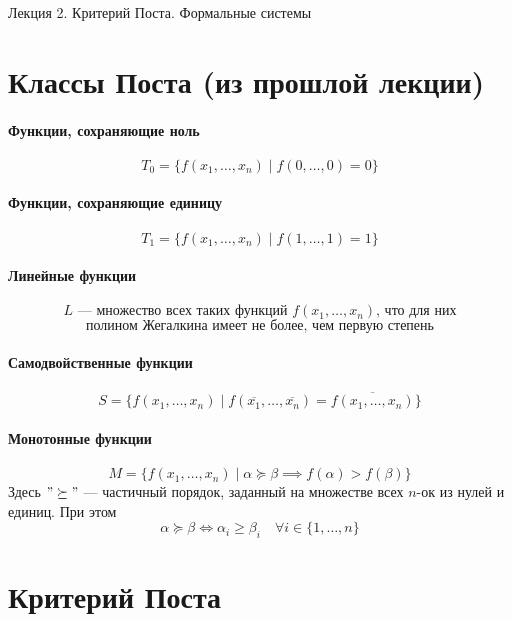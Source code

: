 \documentclass[11pt]{article}
\begin{document}
\begin{titlepage}
    \centering
    \vspace*{\fill}  %

    {\Huge Лекция 2. Критерий Поста. Формальные системы
    \par}

    \vspace*{\fill}  %
\end{titlepage}

\setcounter{page}{1}

\section{Классы Поста (из прошлой лекции)}

\paragraph{Функции, сохраняющие ноль}
\[T_0 = \{f(x_1, \ldots, x_n) \mid f(0, \ldots, 0) = 0\}\]
\paragraph{Функции, сохраняющие единицу}
\[T_1 = \{f(x_1, \ldots, x_n) \mid f(1, \ldots, 1) = 1\}\]
\paragraph{Линейные функции}
\[L \text{ --- множество всех таких функций } f(x_1, \ldots, x_n) \text{, что для них}\]
\[\text{полином Жегалкина имеет не более, чем первую степень}\]
\paragraph{Самодвойственные функции}
\[S = \{f(x_1, \ldots, x_n) \mid f(\overline{x_1}, \ldots, \overline{x_n}) = \overline{f(x_1, \ldots, x_n)}\}\]
\paragraph{Монотонные функции}
\[M = \{f(x_1, \ldots, x_n) \mid \alpha \succeq \beta \implies f(\alpha) > f(\beta)\}\]
Здесь $"\succeq"$ --- частичный порядок, заданный на множестве всех $n$-ок из нулей и единиц. При этом 
\[\alpha \succeq \beta \iff \alpha_i \geq \beta_i \quad \forall i \in \{1, \ldots, n\}\]

\section{Критерий Поста}
\end{document}
